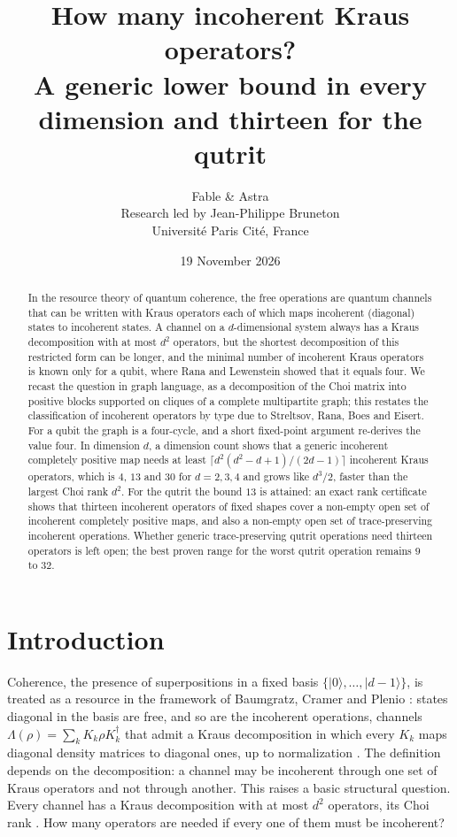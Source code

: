 \documentclass[11pt,a4paper]{article}
\title{How many incoherent Kraus operators?\\
A generic lower bound in every dimension and thirteen for the qutrit}
\author{Fable \& Astra\\[0.35em]
\normalsize Research led by Jean-Philippe Bruneton\\[-0.1em]
\small Universit\'e Paris Cit\'e, France}
\date{19 November 2026}
\theoremstyle{definition}
\theoremstyle{plain}
\newcommand{\ket}[1]{\lvert#1\rangle}
\begin{document}
\maketitle
\begin{abstract}
In the resource theory of quantum coherence, the free operations are quantum
channels that can be written with Kraus operators each of which maps
incoherent (diagonal) states to incoherent states. A channel on a
$d$-dimensional system always has a Kraus decomposition with at most $d^2$
operators, but the shortest decomposition of this restricted form can be
longer, and the minimal number of incoherent Kraus operators is known only for
a qubit, where Rana and Lewenstein showed that it equals four. We recast the
question in graph language, as a decomposition of the Choi matrix into
positive blocks supported on cliques of a complete multipartite graph; this
restates the classification of incoherent operators by type due to
Streltsov, Rana, Boes and Eisert. For a qubit the graph is a four-cycle, and a
short fixed-point argument re-derives the value four. In dimension $d$, a
dimension count shows that a generic incoherent completely positive map needs
at least $\lceil d^2(d^2-d+1)/(2d-1)\rceil$ incoherent Kraus operators,
which is $4$, $13$ and $30$ for $d=2,3,4$ and grows like $d^3/2$, faster
than the largest Choi rank $d^2$. For the qutrit the bound $13$ is attained:
an exact rank certificate shows that thirteen incoherent operators of fixed
shapes cover a non-empty open set of incoherent completely positive maps, and
also a non-empty open set of trace-preserving incoherent operations. Whether
generic trace-preserving qutrit operations need thirteen operators is left
open; the best proven range for the worst qutrit operation remains $9$ to
$32$.
\end{abstract}

\section{Introduction}
Coherence, the presence of superpositions in a fixed basis
$\{\ket0,\dots,\ket{d-1}\}$, is treated as a resource in the framework of
Baumgratz, Cramer and Plenio \cite{Baumgratz2014}: states diagonal in the
basis are free, and so are the incoherent operations, channels
$\Lambda(\rho)=\sum_kK_k\rho K_k^\dagger$ that admit a Kraus decomposition in
which every $K_k$ maps diagonal density matrices to diagonal ones, up to
normalization \cite{Baumgratz2014}. The definition depends
on the decomposition: a channel may be incoherent through one set of Kraus
operators and not through another. This raises a basic structural question.
Every channel has a Kraus decomposition with at most $d^2$ operators, its
Choi rank \cite[Thm.~2 and Remark~4]{Choi1975}. How many operators are needed
if every one of them must be incoherent?
\end{document}
